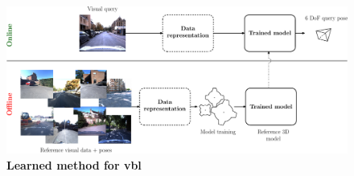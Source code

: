 \begin{figure}[t]
	\centering

	\includegraphics[width=\linewidth]{methods/learned_method}
	\caption[Learned method]{\textbf{Learned method for \acs{vbl}} \label{fig:learned_method}}
\end{figure}
